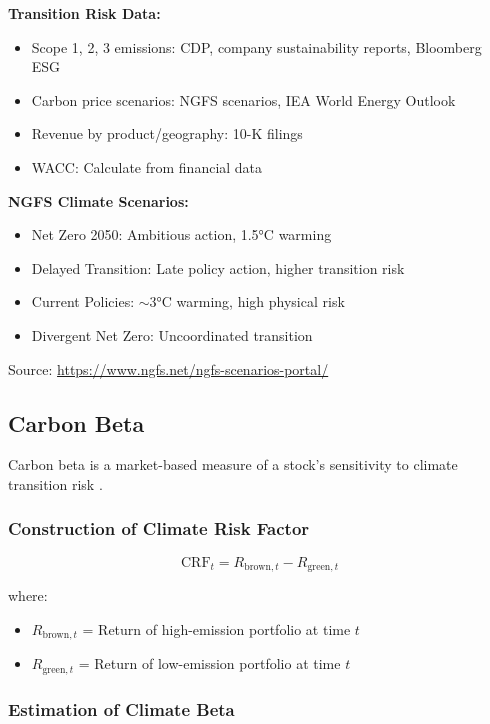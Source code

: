\documentclass[11pt,a4paper]{article}
\begin{document}
\textbf{Transition Risk Data:}
\begin{itemize}
    \item Scope 1, 2, 3 emissions: CDP, company sustainability reports, Bloomberg ESG
    \item Carbon price scenarios: NGFS scenarios, IEA World Energy Outlook
    \item Revenue by product/geography: 10-K filings
    \item WACC: Calculate from financial data
\end{itemize}

\textbf{NGFS Climate Scenarios:}
\begin{itemize}
    \item Net Zero 2050: Ambitious action, 1.5°C warming
    \item Delayed Transition: Late policy action, higher transition risk
    \item Current Policies: $\sim$3°C warming, high physical risk
    \item Divergent Net Zero: Uncoordinated transition
\end{itemize}

Source: \url{https://www.ngfs.net/ngfs-scenarios-portal/}

\subsection{Carbon Beta}

Carbon beta is a market-based measure of a stock's sensitivity to climate transition risk \citep{Huij2023, Robeco2024, Gorgen2024}.

\subsubsection{Construction of Climate Risk Factor}

\begin{equation}
\text{CRF}_t = R_{\text{brown},t} - R_{\text{green},t}
\end{equation}

where:
\begin{itemize}
    \item $R_{\text{brown},t}$ = Return of high-emission portfolio at time $t$
    \item $R_{\text{green},t}$ = Return of low-emission portfolio at time $t$
\end{itemize}

\subsubsection{Estimation of Climate Beta}
\end{document}
